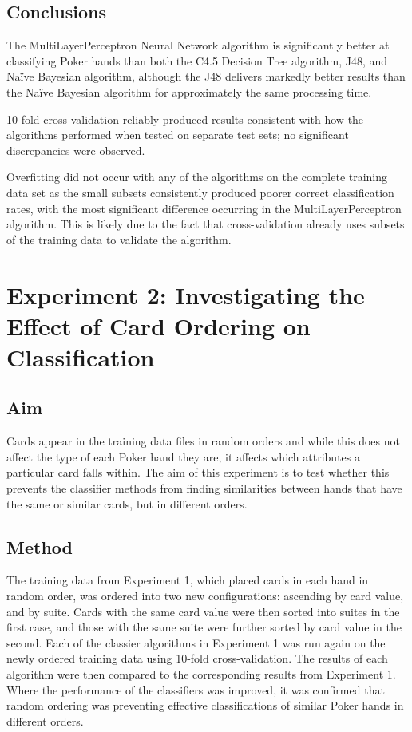 \documentclass[10pt, a4paper]{article}
\begin{document}
\subsection*{Conclusions}

The MultiLayerPerceptron Neural Network algorithm is significantly better at classifying Poker hands than both the C4.5 Decision Tree algorithm, J48, and Na\"ive Bayesian algorithm, although the J48 delivers markedly better results than the Na\"ive Bayesian algorithm for approximately the same processing time.

10-fold cross validation reliably produced results consistent with how the algorithms performed when tested on separate test sets; no significant discrepancies were observed. 

Overfitting did not occur with any of the algorithms on the complete training data set as the small subsets consistently produced poorer correct classification rates, with the most significant difference occurring in the MultiLayerPerceptron algorithm. This is likely due to the fact that cross-validation already uses subsets of the training data to validate the algorithm.


\section*{Experiment 2: Investigating the Effect of Card Ordering on Classification}

\subsection*{Aim}

Cards appear in the training data files in random orders and while this does not affect the type of each Poker hand they are, it affects which attributes a particular card falls within. The aim of this experiment is to test whether this prevents the classifier methods from finding similarities between hands that have the same or similar cards, but in different orders.

\subsection*{Method}

The training data from Experiment 1, which placed cards in each hand in random order, was ordered into two new configurations: ascending by card value, and by suite. Cards with the same card value were then sorted into suites in the first case, and those with the same suite were further sorted by card value in the second. Each of the classier algorithms in Experiment 1 was run again on the newly ordered training data using 10-fold cross-validation. The results of each algorithm were then compared to the corresponding results from Experiment 1. Where the performance of the classifiers was improved, it was confirmed that random ordering was preventing effective classifications of similar Poker hands in different orders.
\end{document}
